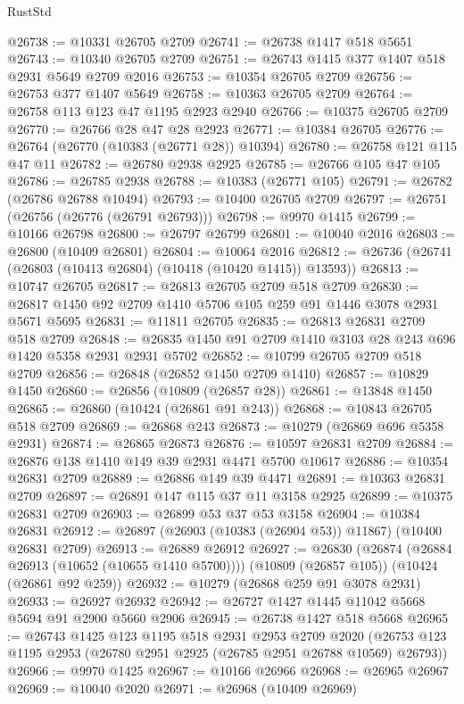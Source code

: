 \begin{lexlean}{RustStd}
\begin{coremodule}
@26738 := @10331 @26705 @2709
@26741 := @26738 @1417 @518 @5651
@26743 := @10340 @26705 @2709
@26751 := @26743 @1415 @377 @1407 @518 @2931 @5649 @2709 @2016
@26753 := @10354 @26705 @2709
@26756 := @26753 @377 @1407 @5649
@26758 := @10363 @26705 @2709
@26764 := @26758 @113 @123 @47 @1195 @2923 @2940
@26766 := @10375 @26705 @2709
@26770 := @26766 @28 @47 @28 @2923
@26771 := @10384 @26705
@26776 := @26764 (@26770 (@10383 (@26771 @28)) @10394)
@26780 := @26758 @121 @115 @47 @11
@26782 := @26780 @2938 @2925
@26785 := @26766 @105 @47 @105
@26786 := @26785 @2938
@26788 := @10383 (@26771 @105)
@26791 := @26782 (@26786 @26788 @10494)
@26793 := @10400 @26705 @2709
@26797 := @26751 (@26756 (@26776 (@26791 @26793)))
@26798 := @9970 @1415
@26799 := @10166 @26798
@26800 := @26797 @26799
@26801 := @10040 @2016
@26803 := @26800 (@10409 @26801)
@26804 := @10064 @2016
@26812 := @26736 (@26741 (@26803 (@10413 @26804) (@10418 (@10420 @1415)) @13593))
@26813 := @10747 @26705
@26817 := @26813 @26705 @2709 @518 @2709
@26830 := @26817 @1450 @92 @2709 @1410 @5706 @105 @259 @91 @1446 @3078 @2931 @5671 @5695
@26831 := @11811 @26705
@26835 := @26813 @26831 @2709 @518 @2709
@26848 := @26835 @1450 @91 @2709 @1410 @3103 @28 @243 @696 @1420 @5358 @2931 @2931 @5702
@26852 := @10799 @26705 @2709 @518 @2709
@26856 := @26848 (@26852 @1450 @2709 @1410)
@26857 := @10829 @1450
@26860 := @26856 (@10809 (@26857 @28))
@26861 := @13848 @1450
@26865 := @26860 (@10424 (@26861 @91 @243))
@26868 := @10843 @26705 @518 @2709
@26869 := @26868 @243
@26873 := @10279 (@26869 @696 @5358 @2931)
@26874 := @26865 @26873
@26876 := @10597 @26831 @2709
@26884 := @26876 @138 @1410 @149 @39 @2931 @4471 @5700 @10617
@26886 := @10354 @26831 @2709
@26889 := @26886 @149 @39 @4471
@26891 := @10363 @26831 @2709
@26897 := @26891 @147 @115 @37 @11 @3158 @2925
@26899 := @10375 @26831 @2709
@26903 := @26899 @53 @37 @53 @3158
@26904 := @10384 @26831
@26912 := @26897 (@26903 (@10383 (@26904 @53)) @11867) (@10400 @26831 @2709)
@26913 := @26889 @26912
@26927 := @26830
    (@26874 (@26884 @26913 (@10652 (@10655 @1410 @5700))))
    (@10809 (@26857 @105))
    (@10424 (@26861 @92 @259))
@26932 := @10279 (@26868 @259 @91 @3078 @2931)
@26933 := @26927 @26932
@26942 := @26727 @1427 @1445 @11042 @5668 @5694 @91 @2900 @5660 @2906
@26945 := @26738 @1427 @518 @5668
@26965 := @26743
    @1425
    @123
    @1195
    @518
    @2931
    @2953
    @2709
    @2020
    (@26753 @123 @1195 @2953 (@26780 @2951 @2925 (@26785 @2951 @26788 @10569) @26793))
@26966 := @9970 @1425
@26967 := @10166 @26966
@26968 := @26965 @26967
@26969 := @10040 @2020
@26971 := @26968 (@10409 @26969)

\end{coremodule}
\end{lexlean}
